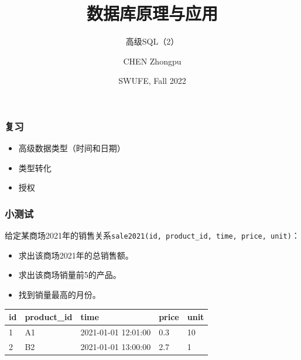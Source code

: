 \documentclass[aspectratio=169, 14pt]{beamer}
\title[Database Principles and Applications] %
{数据库原理与应用}
\subtitle{高级SQL（2）}
\author[CHEN Zhongpu] %
{CHEN Zhongpu}
\institute[] %
{
  School of Computing and Artificial Intelligence \\
  \href{mailto:zpchen@swufe.edu.cn}{zpchen@swufe.edu.cn}
}
\date[] %
{SWUFE, Fall 2022}
\begin{document}
\frame{\titlepage}


\begin{frame}
    \frametitle{复习}
    \begin{itemize}
        \item 高级数据类型（时间和日期）
        \item 类型转化
        \item 授权
    \end{itemize}

\end{frame}
\begin{frame}
    \frametitle{小测试}
给定某商场2021年的销售关系\texttt{sale2021(id, product\_id, time, price, unit)}：
\begin{itemize}
    \item 求出该商场2021年的总销售额。
    \item 求出该商场销量前5的产品。
    \item 找到销量最高的月份。
\end{itemize}
\begin{table}
    \begin{tabular}{lllll}
      \toprule
      id & product\_id & time & price & unit \\
      \midrule
      1 & A1 & 2021-01-01 12:01:00 & 0.3 & 10 \\
      2 & B2 & 2021-01-01 13:00:00 & 2.7 & 1 \\
      \bottomrule
    \end{tabular}
\end{table}
\end{frame}
\end{document}
